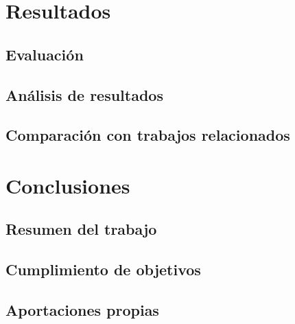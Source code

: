 \documentclass[a4paper,11pt]{report}
\begin{document}
\lipsum[12]


\chapter{Resultados}
\label{chap:resultados}

\lipsum[13]

\section{Evaluación}

\lipsum[14]

\section{Análisis de resultados}

\lipsum[15]

\section{Comparación con trabajos relacionados}

\lipsum[16]


\chapter{Conclusiones}
\label{chap:conclusiones}

\lipsum[17]

\section{Resumen del trabajo}

\lipsum[18]

\section{Cumplimiento de objetivos}

\lipsum[19]

\section{Aportaciones propias}
\end{document}
